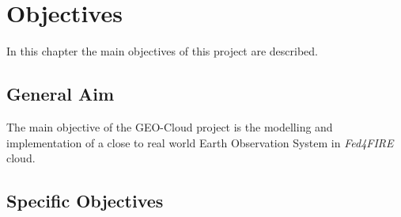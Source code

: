\chapter{Objectives}
\label{chap:objetivos}
In this chapter the main objectives of this project are described.

\section{General Aim}

The main objective of the GEO-Cloud project is the modelling and
implementation of a close to real world Earth Observation System in
\emph{Fed4FIRE} cloud.

\section{Specific Objectives}


